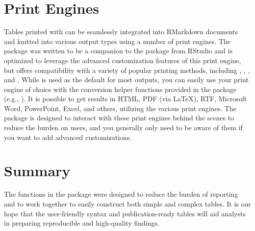 \section{Print Engines}

Tables printed with  can be seamlessly integrated into RMarkdown documents and knitted into various output types using a number of print engines.
The package was written to be a companion to the  package from RStudio and is optimized to leverage the advanced customization features of this print engine, but offers compatibility with a variety of popular printing methods, including  \citep{knitr},   \citep{flextable},  \citep{huxtable}, and  \citep{kableExtra}.
While  is used as the default for most outputs, you can easily use your print engine of choice with the conversion helper functions provided in the package (e.g., ).
It is possible to get results in HTML, PDF (via \LaTeX), RTF, Microsoft Word, PowerPoint, Excel, and others, utilizing the various print engines.
The package is designed to interact with these print engines behind the scenes to reduce the burden on users, and you generally only need to be aware of them if you want to add advanced customizations.

\section{Summary}

The functions in the  package were designed to reduce the burden of reporting and to work together to easily construct both simple and complex tables.
It is our hope that the user-friendly syntax and publication-ready tables will aid analysts in preparing reproducible and high-quality findings.



\address{Daniel D. Sjoberg\\
  Memorial Sloan Kettering Cancer Center\\
  1275 York Ave., New York, New York 10022\\
  USA\\
  ORCiD: 0000-0003-0862-2018\\
  }

\address{Karissa Whiting\\
  Memorial Sloan Kettering Cancer Center\\
  1275 York Ave., New York, New York 10022\\
  USA\\
  ORCiD: 0000-0002-4683-1868\\
  }

